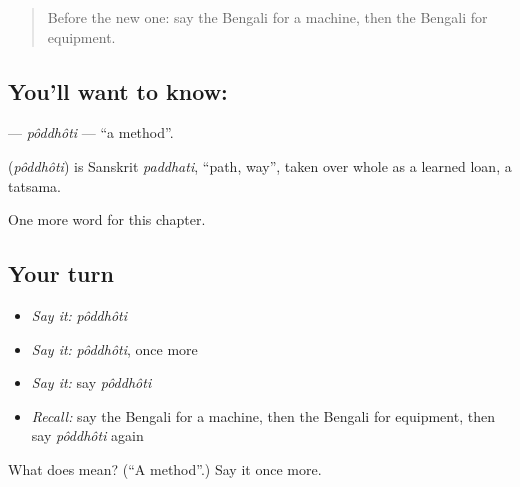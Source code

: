 \label{lesson:BN-C100-poddhoti}



\begin{quote}
Before the new one: say the Bengali for a machine, then the Bengali for equipment.
\end{quote}

\subsection*{You'll want to know: }
\textbf{} — \emph{pôddhôti} — \textquotedblleft{}a method\textquotedblright{}.

\begin{cousinweb}
\textbf{} (\emph{pôddhôti}) is Sanskrit \emph{paddhati}, \textquotedblleft{}path, way\textquotedblright{}, taken over whole as a learned loan, a tatsama.
\end{cousinweb}

\begin{grammarlens}[title={What you've built}]
One more word for this chapter.
\end{grammarlens}

\subsection*{Your turn}
\begin{itemize}
\raggedright
  \item \emph{Say it:} \emph{pôddhôti}
  \item \emph{Say it:} \emph{pôddhôti}, once more
  \item \emph{Say it:} say \emph{pôddhôti}
  \item \emph{Recall:} say the Bengali for a machine, then the Bengali for equipment, then say \emph{pôddhôti} again
\end{itemize}

\begin{tcolorbox}[breakable,colback=teal!4,colframe=teal!35!black,title={Before you move on}]
What does  mean? (\textquotedblleft{}A method\textquotedblright{}.) Say it once more.
\end{tcolorbox}
